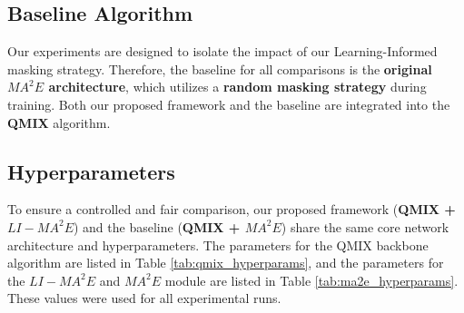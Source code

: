 
   
        
 
  
    

\subsection{Baseline Algorithm}

Our experiments are designed to isolate the impact of our Learning-Informed masking strategy. Therefore, the baseline for all comparisons is the \textbf{original ${MA}^2E$ architecture}, which utilizes a \textbf{random masking strategy} during training. Both our proposed framework and the baseline are integrated into the \textbf{\ac{QMIX}} algorithm.


\subsection{Hyperparameters}

To ensure a controlled and fair comparison, our proposed framework (\textbf{QMIX + $LI-{MA}^2E$}) and the baseline (\textbf{QMIX + ${MA}^2E$}) share the same core network architecture and hyperparameters. The parameters for the QMIX backbone algorithm are listed in Table \ref{tab:qmix_hyperparams}, and the parameters for the $LI-{MA}^2E$ and ${MA}^2E$ module are listed in Table \ref{tab:ma2e_hyperparams}. These values were used for all experimental runs.

